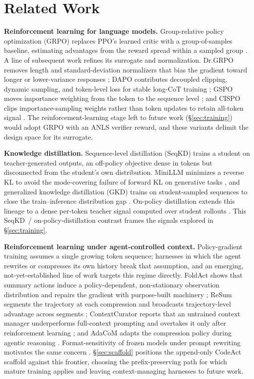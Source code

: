 \section{Related Work}
\label{sec:related}

\textbf{Reinforcement learning for language models.} Group-relative policy optimization (GRPO) replaces PPO's learned critic with a group-of-samples baseline, estimating advantages from the reward spread within a sampled group \citep{grpo}. A line of subsequent work refines its surrogate and normalization. Dr.GRPO removes length and standard-deviation normalizers that bias the gradient toward longer or lower-variance responses \citep{drgrpo}; DAPO contributes decoupled clipping, dynamic sampling, and token-level loss for stable long-CoT training \citep{dapo}; GSPO moves importance weighting from the token to the sequence level \citep{gspo}; and CISPO clips importance-sampling weights rather than token updates to retain all-token signal \citep{cispo}. The reinforcement-learning stage left to future work (\S\ref{sec:training}) would adopt GRPO with an ANLS verifier reward, and these variants delimit the design space for its surrogate.

\textbf{Knowledge distillation.} Sequence-level distillation (SeqKD) trains a student on teacher-generated outputs, an off-policy objective dense in tokens but disconnected from the student's own distribution. MiniLLM minimizes a reverse KL to avoid the mode-covering failure of forward KL on generative tasks \citep{minillm}, and generalized knowledge distillation (GKD) trains on student-sampled sequences to close the train--inference distribution gap \citep{gkd}. On-policy distillation extends this lineage to a dense per-token teacher signal computed over student rollouts \citep{opd}. This SeqKD~/ on-policy-distillation contrast frames the signals explored in \S\ref{sec:training}.

\textbf{Reinforcement learning under agent-controlled context.} Policy-gradient training assumes a single growing token sequence; harnesses in which the agent rewrites or compresses its own history break that assumption, and an emerging, not-yet-established line of work targets this regime directly. FoldAct shows that summary actions induce a policy-dependent, non-stationary observation distribution and repairs the gradient with purpose-built machinery \citep{foldact}; ReSum segments the trajectory at each compression and broadcasts trajectory-level advantage across segments \citep{resum}; ContextCurator reports that an untrained context manager underperforms full-context prompting and overtakes it only after reinforcement learning \citep{contextcurator}; and AdaCoM adapts the compression policy during agentic reasoning \citep{adacom}. Format-sensitivity of frozen models under prompt rewriting motivates the same concern \citep{sclar}. \S\ref{sec:scaffold} positions the append-only CodeAct scaffold against this frontier, choosing the prefix-preserving path for which mature training applies and leaving context-managing harnesses to future work.

